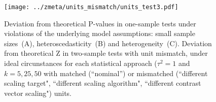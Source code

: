 \documentclass[preprint]{elsarticle}
\newcommand{\nStudies}{k}
\newcommand{\varBetween}{\tau^2}
\begin{document}
\begin{figure}[h]
	\centering
 	\texttt{[image: ../zmeta/units\_mismatch/units\_test3.pdf]}
	\caption{Deviation from theoretical P-values in one-sample tests under violations of the underlying model assumptions: small sample sizes~(A), heteroscedasticity~(B) and heterogeneity~(C). Deviation from theoretical Z in two-sample tests with unit mismatch, under ideal circunstances for each statistical approach ($\varBetween=1$ and $\nStudies = 5, 25, 50$ with matched (``nominal'') or mismatched (``different scaling target", ``different scaling algorithm", ``different contrast vector scaling") units.}
	\label{fig:units_test3}
\end{figure}






\end{document}
